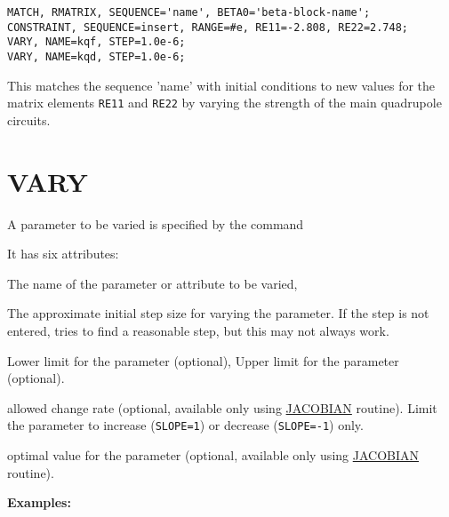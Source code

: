\begin{verbatim}
MATCH, RMATRIX, SEQUENCE='name', BETA0='beta-block-name';
CONSTRAINT, SEQUENCE=insert, RANGE=#e, RE11=-2.808, RE22=2.748;
VARY, NAME=kqf, STEP=1.0e-6;
VARY, NAME=kqd, STEP=1.0e-6;
\end{verbatim}

This matches the sequence 'name' with initial conditions to new values
for the matrix elements \texttt{RE11} and \texttt{RE22} by varying the
strength of the main quadrupole circuits.




%
 
\section{VARY}
\label{sec:vary}
A parameter to be varied is specified by the command 


It has six attributes: 
\begin{madlist}
   The name of the parameter or attribute to be varied,  

   The approximate initial step size for varying the
  parameter. If the step is not entered, \madx tries to find a
  reasonable step, but this may not always work.  

   Lower limit for the parameter (optional), 
   Upper limit for the parameter (optional). 

   allowed change rate (optional, available only using
  \hyperref[subsec:match-jacobian]{JACOBIAN} routine). Limit the
  parameter to increase (\texttt{SLOPE=1}) or decrease (\texttt{SLOPE=-1}) only.

   optimal value for the parameter (optional, available
  only using \hyperref[subsec:match-jacobian]{JACOBIAN} routine).  
\end{madlist}

\textbf{Examples:}

